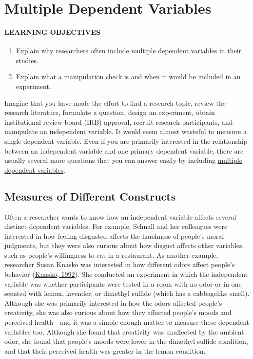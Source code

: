 \documentclass[
]{krantz}
\providecommand{\tightlist}{%
  \setlength{\itemsep}{0pt}\setlength{\parskip}{0pt}}
\begin{document}
\hypertarget{multiple-dependent-variables}{%
\section{Multiple Dependent Variables}\label{multiple-dependent-variables}}

\hypertarget{learning-objectives-20}{%
\paragraph*{LEARNING OBJECTIVES}\label{learning-objectives-20}}

\begin{enumerate}
\def\labelenumi{\arabic{enumi}.}
\tightlist
\item
  Explain why researchers often include multiple dependent variables in their studies.
\item
  Explain what a manipulation check is and when it would be included in an experiment.
\end{enumerate}

Imagine that you have made the effort to find a research topic, review the research literature, formulate a question, design an experiment, obtain institutional review board (IRB) approval, recruit research participants, and manipulate an independent variable. It would seem almost wasteful to measure a single dependent variable. Even if you are primarily interested in the relationship between an independent variable and one primary dependent variable, there are usually several more questions that you can answer easily by including \protect\hyperlink{multiple-dependent-variables-1}{multiple dependent variables}.

\hypertarget{measures-of-different-constructs}{%
\subsection*{Measures of Different Constructs}\label{measures-of-different-constructs}}


Often a researcher wants to know how an independent variable affects several distinct dependent variables. For example, Schnall and her colleagues were interested in how feeling disgusted affects the harshness of people's moral judgments, but they were also curious about how disgust affects other variables, such as people's willingness to eat in a restaurant. As another example, researcher Susan Knasko was interested in how different odors affect people's behavior (\protect\hyperlink{ref-knasko1992ambient}{Knasko, 1992}). She conducted an experiment in which the independent variable was whether participants were tested in a room with no odor or in one scented with lemon, lavender, or dimethyl sulfide (which has a cabbagelike smell). Although she was primarily interested in how the odors affected people's creativity, she was also curious about how they affected people's moods and perceived health---and it was a simple enough matter to measure these dependent variables too. Although she found that creativity was unaffected by the ambient odor, she found that people's moods were lower in the dimethyl sulfide condition, and that their perceived health was greater in the lemon condition.
\end{document}
